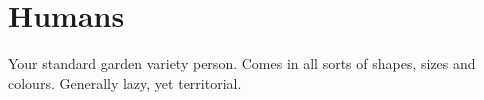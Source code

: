 \section{Humans}\label{sec:human}
Your standard garden variety person.
Comes in all sorts of shapes, sizes and colours.
Generally lazy, yet territorial.